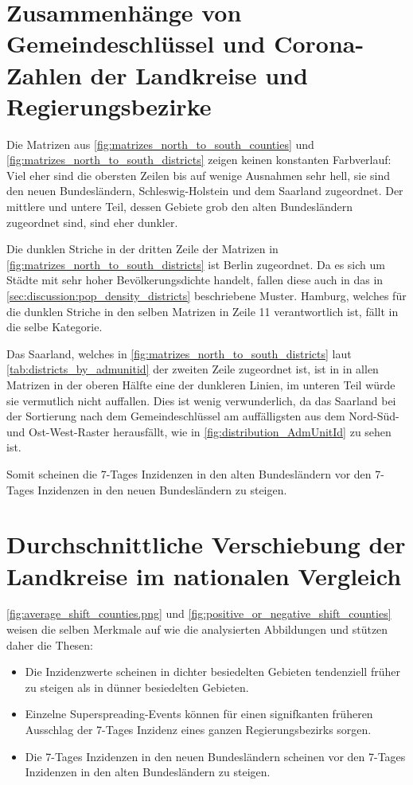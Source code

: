 \section{Zusammenhänge von Gemeindeschlüssel und Corona-Zahlen der Landkreise und Regierungsbezirke}
Die Matrizen aus \autoref{fig:matrizes_north_to_south_counties} und \autoref{fig:matrizes_north_to_south_districts} zeigen keinen konstanten Farbverlauf: Viel eher sind die obersten Zeilen bis auf wenige Ausnahmen sehr hell, sie sind den neuen Bundesländern, Schleswig-Holstein und dem Saarland zugeordnet. Der mittlere und untere Teil, dessen Gebiete grob den alten Bundesländern zugeordnet sind, sind eher dunkler.

Die dunklen Striche in der dritten Zeile der Matrizen in \autoref{fig:matrizes_north_to_south_districts} ist Berlin zugeordnet. Da es sich um Städte mit sehr hoher Bevölkerungsdichte handelt, fallen diese auch in das in \autoref{sec:discussion:pop_density_districts} beschriebene Muster. Hamburg, welches für die dunklen Striche in den selben Matrizen in Zeile 11 verantwortlich ist, fällt in die selbe Kategorie.

Das Saarland, welches in \autoref{fig:matrizes_north_to_south_districts} laut \autoref{tab:districts_by_admunitid} der zweiten Zeile zugeordnet ist, ist in in allen Matrizen in der oberen Hälfte eine der dunkleren Linien, im unteren Teil würde sie vermutlich nicht auffallen.
Dies ist wenig verwunderlich, da das Saarland bei der Sortierung nach dem Gemeindeschlüssel am auffälligsten aus dem Nord-Süd- und Ost-West-Raster herausfällt, wie in \autoref{fig:distribution_AdmUnitId} zu sehen ist.

Somit scheinen die 7-Tages Inzidenzen in den alten Bundesländern vor den 7-Tages Inzidenzen in den neuen Bundesländern zu steigen.


\section{Durchschnittliche Verschiebung der Landkreise im nationalen Vergleich}

\autoref{fig:average_shift_counties.png} und
\autoref{fig:positive_or_negative_shift_counties} weisen die selben Merkmale auf wie die analysierten Abbildungen  und stützen daher die Thesen:

\begin{itemize}
    \item Die Inzidenzwerte scheinen in dichter besiedelten Gebieten tendenziell früher zu steigen als in dünner besiedelten Gebieten.
    \item Einzelne Superspreading-Events können für einen signifkanten früheren Ausschlag der 7-Tages Inzidenz eines ganzen Regierungsbezirks sorgen.
    \item Die 7-Tages Inzidenzen in den neuen Bundesländern scheinen vor den 7-Tages Inzidenzen in den alten Bundesländern zu steigen.
\end{itemize}

